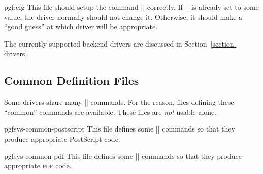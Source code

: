 \begin{filedescription}{pgf.cfg}
  This file should setup the command |\pgfsysdriver| correctly. If
  |\pgfsysdriver| is already set to some value, the driver normally
  should not change it. Otherwise, it should make a ``good guess'' at
  which driver will be appropriate.
\end{filedescription}


The currently supported backend drivers are discussed in
Section~\ref{section-drivers}. 


\subsection{Common Definition Files}

Some drivers share many |\pgfsys@| commands. For the reason, files
defining these ``common'' commands are available. These files are
\emph{not} usable alone.

\begin{filedescription}{pgfsys-common-postscript}
  This file defines some |\pgfsys@| commands so that they produce
  appropriate PostScript code.
\end{filedescription}

\begin{filedescription}{pgfsys-common-pdf}
  This file defines some |\pgfsys@| commands so that they produce
  appropriate \textsc{pdf} code.
\end{filedescription}


